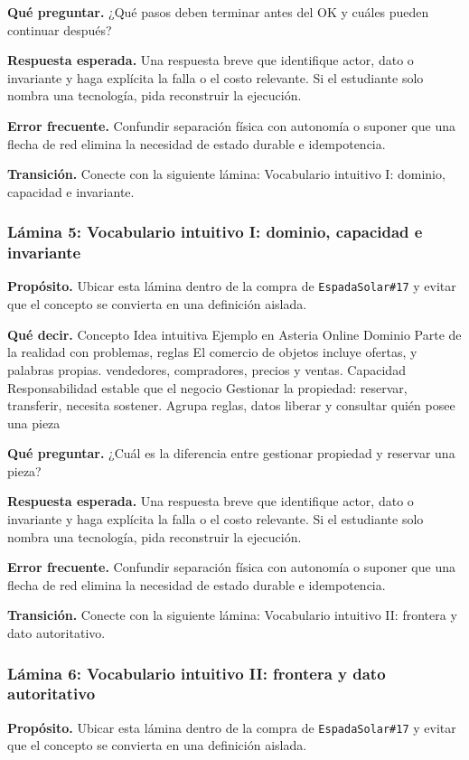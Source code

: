 \documentclass[variant=docente,cover=institutional,mode=screen]{ua-engineering-v6-article}
\begin{document}
\textbf{Qué preguntar.} ¿Qué pasos deben terminar antes del OK y cuáles pueden continuar después?

\textbf{Respuesta esperada.} Una respuesta breve que identifique actor, dato o invariante y haga explícita la falla o el costo relevante. Si el estudiante solo nombra una tecnología, pida reconstruir la ejecución.

\textbf{Error frecuente.} Confundir separación física con autonomía o suponer que una flecha de red elimina la necesidad de estado durable e idempotencia.

\textbf{Transición.} Conecte con la siguiente lámina: Vocabulario intuitivo I: dominio, capacidad e invariante.

\subsubsection*{Lámina 5: Vocabulario intuitivo I: dominio, capacidad e invariante}
\textbf{Propósito.} Ubicar esta lámina dentro de la compra de \texttt{EspadaSolar\#17} y evitar que el concepto se convierta en una definición aislada.

\textbf{Qué decir.} Concepto Idea intuitiva Ejemplo en Asteria Online Dominio Parte de la realidad con problemas, reglas El comercio de objetos incluye ofertas, y palabras propias. vendedores, compradores, precios y ventas. Capacidad Responsabilidad estable que el negocio Gestionar la propiedad: reservar, transferir, necesita sostener. Agrupa reglas, datos liberar y consultar quién posee una pieza

\textbf{Qué preguntar.} ¿Cuál es la diferencia entre gestionar propiedad y reservar una pieza?

\textbf{Respuesta esperada.} Una respuesta breve que identifique actor, dato o invariante y haga explícita la falla o el costo relevante. Si el estudiante solo nombra una tecnología, pida reconstruir la ejecución.

\textbf{Error frecuente.} Confundir separación física con autonomía o suponer que una flecha de red elimina la necesidad de estado durable e idempotencia.

\textbf{Transición.} Conecte con la siguiente lámina: Vocabulario intuitivo II: frontera y dato autoritativo.

\subsubsection*{Lámina 6: Vocabulario intuitivo II: frontera y dato autoritativo}
\textbf{Propósito.} Ubicar esta lámina dentro de la compra de \texttt{EspadaSolar\#17} y evitar que el concepto se convierta en una definición aislada.
\end{document}
